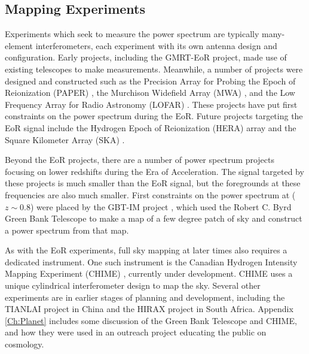 \subsection{Mapping Experiments}

Experiments which seek to measure the \cm power spectrum are typically many-element interferometers, each experiment with its own antenna design and configuration. Early projects, including the GMRT-EoR \cite{paciga_2013} project, made use of existing telescopes to make measurements. Meanwhile, a number of projects were designed and constructed such as the Precision Array for Probing the Epoch of Reionization (PAPER) \cite{pober_2013}\cite{jacobs_2014}, the Murchison Widefield Array (MWA) \cite{bernardi_2013}\cite{tingay_2012}, and the Low Frequency Array for Radio Astronomy (LOFAR) \cite{jelic_2014}\cite{lofar}. These projects have put first constraints on the power spectrum during the EoR. Future projects targeting the EoR signal include the Hydrogen Epoch of Reionization (HERA) \cite{hera}\cite{bernardi_2014} array and the Square Kilometer Array (SKA) \cite{ska}.

Beyond the EoR projects, there are a number of power spectrum projects focusing on lower redshifts during the Era of Acceleration. The \cm signal targeted by these projects is much smaller than the EoR signal, but the foregrounds at these frequencies are also much smaller. First constraints on the power spectrum at ($z \sim 0.8$) were placed by the GBT-IM project \cite{masui_2012}\cite{switzer_2013}, which used the Robert C. Byrd Green Bank Telescope to make a map of a few degree patch of sky and construct a power spectrum from that map. 

As with the EoR experiments, full sky mapping at later times also requires a dedicated instrument. One such instrument is the Canadian Hydrogen Intensity Mapping Experiment (CHIME) \cite{shaw_2014}\cite{chime}, currently under development. CHIME uses a unique cylindrical interferometer design to map the sky. Several other experiments are in earlier stages of planning and development, including the TIANLAI project in China and the HIRAX project in South Africa. Appendix \ref{Ch:Planet} includes some discussion of the Green Bank Telescope and CHIME, and how they were used in an outreach project educating the public on \cm cosmology. 

